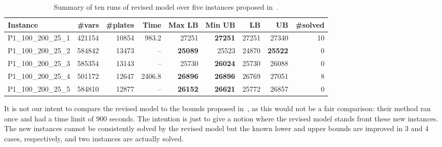 \documentclass[runningheads]{llncs}
\begin{document}
\begin{table}
\caption{Summary of ten runs of revised model over five instances proposed in~\cite{velasco:2019}.}
\setlength\tabcolsep{2.5px}
\begin{tabular}{lrrrrrrrr}
Instance & \#vars & \#plates & Time & Max LB & Min UB & \cite{velasco:2019} LB & \cite{velasco:2019} UB & \#solved\\
\hline
P1\_100\_200\_25\_1 & 421154 & 10854 & 983.2 & 27251 & \textbf{27251} & 27251 & 27340 & 10 \\
P1\_100\_200\_25\_2 & 584842 & 13473 & -- & \textbf{25089} & 25523 & 24870 & \textbf{25522} & 0 \\
P1\_100\_200\_25\_3 & 585354 & 13143 & -- & 25730 & \textbf{26024} & 25730 & 26088 & 0 \\
P1\_100\_200\_25\_4 & 501172 & 12647 & 2406.8 & \textbf{26896} & \textbf{26896} & 26769 & 27051 & 8 \\
P1\_100\_200\_25\_5 & 584810 & 12877 & -- & \textbf{26152} & \textbf{26621} & 25772 & 26857 & 0 \\
\hline
\end{tabular}
\label{tab:velasco_five}
\end{table}

It is not our intent to compare the revised model to the bounds proposed in~\cite{velasco:2019}, as this would not be a fair comparison: their method ran once and had a time limit of 900 seconds.
The intention is just to give a notion where the revised model stands front these new instances.
The new instances cannot be consistently solved by the revised model but the known lower and upper bounds are improved in 3 and 4 cases, respectively, and two instances are actually solved.


\end{document}
